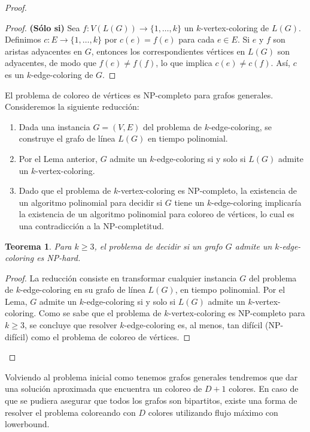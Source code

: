 \documentclass[a4paper]{article}
\newtheorem{theorem}{Teorema}
\begin{document}
\begin{proof}
\begin{proof}
\medskip

\textbf{(Sólo si)} Sea \(f: V(L(G)) \to \{1,\dots,k\}\) un \(k\)-vertex-coloring de \(L(G)\). Definimos \(c: E \to \{1,\dots,k\}\) por \(c(e)=f(e)\) para cada \(e \in E\). Si \(e\) y \(f\) son aristas adyacentes en \(G\), entonces los correspondientes vértices en \(L(G)\) son adyacentes, de modo que \(f(e) \neq f(f)\), lo que implica \(c(e) \neq c(f)\). Así, \(c\) es un \(k\)-edge-coloring de \(G\).
\end{proof}


El problema de coloreo de vértices es NP-completo para grafos generales. Consideremos la siguiente reducción:

\begin{enumerate}[label=\textbf{Paso \arabic*:}, wide, labelwidth=!, labelindent=0pt]
    \item Dada una instancia \(G=(V,E)\) del problema de \(k\)-edge-coloring, se construye el grafo de línea \(L(G)\) en tiempo polinomial.
    \item Por el Lema anterior, \(G\) admite un \(k\)-edge-coloring si y solo si \(L(G)\) admite un \(k\)-vertex-coloring.
    \item Dado que el problema de \(k\)-vertex-coloring es NP-completo, la existencia de un algoritmo polinomial para decidir si \(G\) tiene un \(k\)-edge-coloring implicaría la existencia de un algoritmo polinomial para coloreo de vértices, lo cual es una contradicción a la NP-completitud.
\end{enumerate}

\begin{theorem}
Para \(k \geq 3\), el problema de decidir si un grafo \(G\) admite un \(k\)-edge-coloring es NP-hard.
\end{theorem}

\begin{proof}
La reducción consiste en transformar cualquier instancia \(G\) del problema de \(k\)-edge-coloring en su grafo de línea \(L(G)\), en tiempo polinomial. Por el Lema, \(G\) admite un \(k\)-edge-coloring si y solo si \(L(G)\) admite un \(k\)-vertex-coloring. Como se sabe que el problema de \(k\)-vertex-coloring es NP-completo para \(k \geq 3\), se concluye que resolver \(k\)-edge-coloring es, al menos, tan difícil (NP-difícil) como el problema de coloreo de vértices.
\end{proof}

\end{proof}


Volviendo al problema inicial como tenemos grafos generales tendremos que dar una soluci\'on aproximada que encuentra un coloreo de $D+1$ colores. En caso de que se pudiera asegurar que todos los grafos son bipartitos, existe una forma de resolver el problema coloreando con $D$ colores utilizando flujo m\'aximo con lowerbound.
\end{document}
